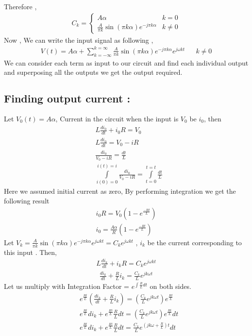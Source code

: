 Therefore ,
\begin{align*}
C_k = \begin{cases}
A\alpha & k = 0 \\
 \frac{A}{\pi k} \sin{(\pi k \alpha)} e ^{- j\pi k \alpha} & k \neq 0
\end{cases}
\end{align*}
Now , We can write the input signal as following , 
\begin{align*}
V(t) = A\alpha + \sum\limits_{k=-\infty}^{k=\infty} \frac{A}{\pi k} \sin{(\pi k \alpha)} e ^{- j\pi k \alpha} e^{j \omega k t} && k \neq 0
\end{align*}
We can consider each term as input to our circuit and find each individual output and superposing all the outputs we get the output required. 
\subsection{Finding output current :}
Let $V_0(t) = A\alpha $, Current in the circuit when the input is $V_0$ be $i_0$, then 
\begin{align*}
&L\frac{di_0}{dt} + i_0 R = V_0 \\
&L\frac{di_0}{dt} = V_0 - iR \\
&\frac{di_0}{V_0 - iR} = \frac{dt}{L} \\
& \int\limits_{i(0)=0}^{i(t)=i} \frac{di_0}{V_0 - iR} = \int\limits_{t=0}^{t=t} \frac{dt}{L}
\end{align*}
Here we assumed initial current as zero, By performing integration we get the following result 
\begin{align*}
i_0R = V_0(1 - e^{\frac{-Rt}{L}}) \\
\boxed{i_0 = \frac{A \alpha}{R}(1 - e^{\frac{-Rt}{L}})}
\end{align*} 
Let $V_k = \frac{A}{\pi k} \sin{(\pi k \alpha)} e ^{- j\pi k \alpha} e^{j \omega k t} = C_k e^{j \omega k t}$ , $i_k$ be the current corresponding to this input . Then,
\begin{align*}
L\frac{di_k}{dt}+i_kR = C_k e^{j\omega kt}
\end{align*}
\begin{align*}
\frac{di_k}{dt}+\frac{R}{L}i_k = \frac{C_k}{L}e^{jk\omega t }
\end{align*}
Let us multiply with Integration Factor = $e^{\int\frac{R}{L}dt}$ on both sides.
\begin{align*}
&e^{\frac{Rt}{L}}(\frac{di_k}{dt}+\frac{R}{L}i_k) = (\frac{C_k}{L}e^{jk\omega t })e^{\frac{Rt}{L}} \\
&e^{\frac{Rt}{L}} di_k + e^{\frac{Rt}{L}} \frac{R}{L} dt = (\frac{C_k}{L}e^{jk\omega t })e^{\frac{Rt}{L}} dt \\
&e^{\frac{Rt}{L}} di_k + e^{\frac{Rt}{L}} \frac{R}{L} dt =  \frac{C_k}{L}e^{(jk \omega +\frac{R}{L})t} dt \\
\end{align*}
